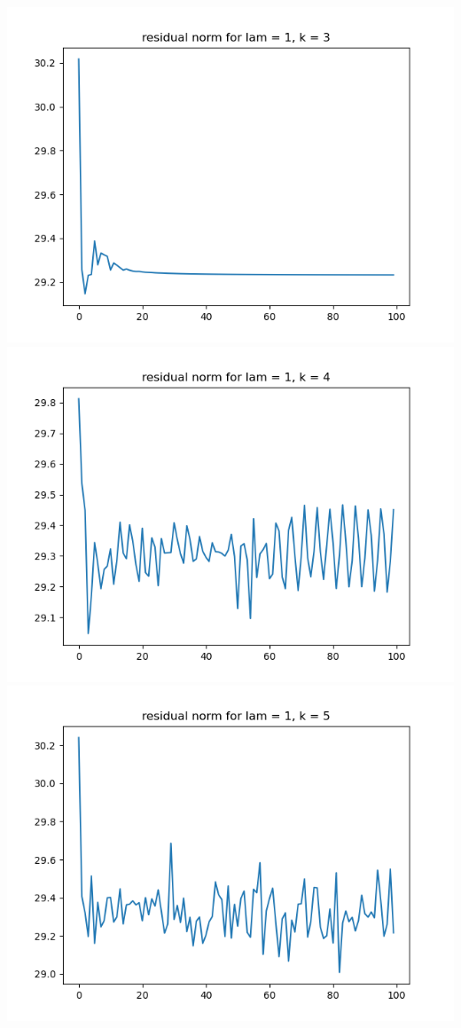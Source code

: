 \documentclass{article}
\begin{document}
\begin{enumerate}
\begin{enumerate}
\begin{center}
			\includegraphics[scale=.3]{hw7p1 residual norm for lamcount = 2, k = 3}
			\includegraphics[scale=.3]{hw7p1 residual norm for lamcount = 2, k = 4}
			\includegraphics[scale=.3]{hw7p1 residual norm for lamcount = 2, k = 5}

\end{center}
\end{enumerate}
\end{enumerate}
\end{document}
